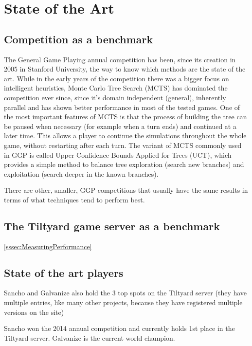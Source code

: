 
\chapter{State of the Art}
\label{chapter:state_of_the_art}

\section{Competition as a benchmark}
The General Game Playing annual competition has been, since its creation in 2005 in Stanford University, the way to know which methods are the state of the art.
While in the early years of the competition there was a bigger focus on intelligent heuristics, Monte Carlo Tree Search (MCTS) has dominated the competition ever since, since it’s domain independent (general), inherently parallel and has shown better performance in most of the tested games. One of the most important features of MCTS is that the process of building the tree can be paused when necessary (for example when a turn ends) and continued at a later time. This allows a player to continue the simulations throughout the whole game, without restarting after each turn.
The variant of MCTS commonly used in GGP is called Upper Confidence Bounds Applied for Trees (UCT), which provides a simple method to balance tree exploration (search new branches) and exploitation (search deeper in the known branches).

There are other, smaller, \gls{GGP} competitions that usually have the same results in terms of what techniques tend to perform best.

\section{The Tiltyard game server as a benchmark}

\ref{sssec:MeasuringPerformance}

\section{State of the art players}

Sancho and Galvanize also hold the 3 top spots on the Tiltyard server (they have multiple entries, like many other projects, because they have registered multiple versions on the site)

Sancho won the 2014 annual competition and currently holds 1st place in the Tiltyard server.
Galvanize is the current world champion.


